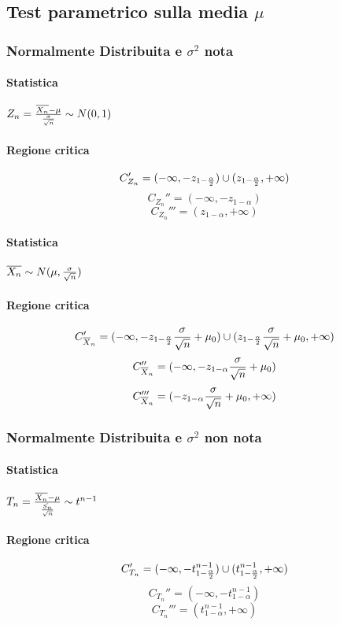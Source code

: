 \documentclass[12pt]{article}
\begin{document}
    \subsection{Test parametrico sulla media $\mu$}
    \subsubsection{Normalmente Distribuita e $\sigma^2$ nota}
    \paragraph{Statistica} $Z_n = {{\overline{X_n}-\mu} \over {\sigma \over \sqrt{n}}} \sim N(0,1)$
    \paragraph{Regione critica} 
    $$C_{Z_n}' = (-\infty, -z_{1-{\alpha \over 2}}) \cup (z_{1-{\alpha \over 2}}, +\infty)$$
    $$C_{Z_n}'' = (-\infty, -z_{1-\alpha})$$
    $$C_{Z_n}''' = (z_{1-\alpha}, +\infty)$$
    \paragraph{Statistica} $\overline{X_n} \sim N(\mu, {\sigma \over \sqrt{n}})$
    \paragraph{Regione critica} 
    $$C_{\overline{X}_n}' = (-\infty, -z_{1-{\alpha \over 2}} {\sigma \over \sqrt{n}} + \mu_0) \cup (z_{1-{\alpha \over 2}}{\sigma \over \sqrt{n}} + \mu_0, +\infty)$$
    $$C_{\overline{X}_n}'' = (-\infty, -z_{1-\alpha}{\sigma \over \sqrt{n}} + \mu_0)$$
    $$C_{\overline{X}_n}''' = (-z_{1-\alpha}{\sigma \over \sqrt{n}} + \mu_0, +\infty)$$
    \newpage
    \subsubsection{Normalmente Distribuita e $\sigma^2$ non nota}
    \paragraph{Statistica} $T_n = {{\overline{X_n}-\mu} \over {\hat{S_n} \over \sqrt{n}}} \sim t^{n-1}$
    \paragraph{Regione critica} 
    $$C_{T_n}' = (-\infty, -t^{n-1}_{1-{\alpha \over 2}}) \cup (t^{n-1}_{1-{\alpha \over 2}}, +\infty)$$
    $$C_{T_n}'' = (-\infty, -t^{n-1}_{1-\alpha})$$
    $$C_{T_n}''' = (t^{n-1}_{1-\alpha}, +\infty)$$
\end{document}
